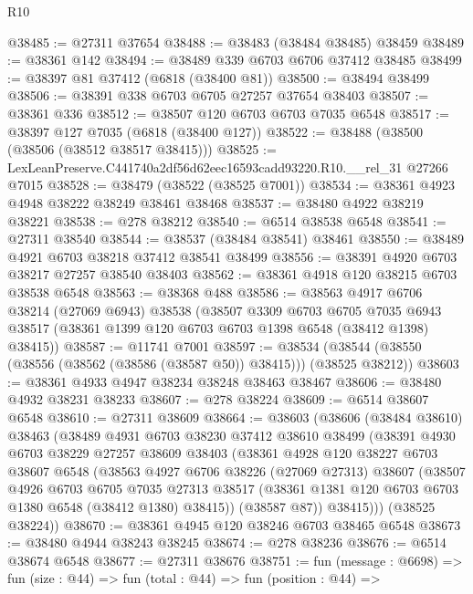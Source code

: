 \begin{lexlean}{R10}
\begin{coremodule}
@38485 := @27311 @37654
@38488 := @38483 (@38484 @38485) @38459
@38489 := @38361 @142
@38494 := @38489 @339 @6703 @6706 @37412 @38485
@38499 := @38397 @81 @37412 (@6818 (@38400 @81))
@38500 := @38494 @38499
@38506 := @38391 @338 @6703 @6705 @27257 @37654 @38403
@38507 := @38361 @336
@38512 := @38507 @120 @6703 @6703 @7035 @6548
@38517 := @38397 @127 @7035 (@6818 (@38400 @127))
@38522 := @38488 (@38500 (@38506 (@38512 @38517 @38415)))
@38525 := LexLeanPreserve.C441740a2df56d62eec16593cadd93220.R10.__rel_31 @27266 @7015
@38528 := @38479 (@38522 (@38525 @7001))
@38534 := @38361 @4923 @4948 @38222 @38249 @38461 @38468
@38537 := @38480 @4922 @38219 @38221
@38538 := @278 @38212
@38540 := @6514 @38538 @6548
@38541 := @27311 @38540
@38544 := @38537 (@38484 @38541) @38461
@38550 := @38489 @4921 @6703 @38218 @37412 @38541 @38499
@38556 := @38391 @4920 @6703 @38217 @27257 @38540 @38403
@38562 := @38361 @4918 @120 @38215 @6703 @38538 @6548
@38563 := @38368 @488
@38586 := @38563
    @4917
    @6706
    @38214
    (@27069 @6943)
    @38538
    (@38507
      @3309
      @6703
      @6705
      @7035
      @6943
      @38517
      (@38361 @1399 @120 @6703 @6703 @1398 @6548 (@38412 @1398) @38415))
@38587 := @11741 @7001
@38597 := @38534 (@38544 (@38550 (@38556 (@38562 (@38586 (@38587 @50)) @38415))) (@38525 @38212))
@38603 := @38361 @4933 @4947 @38234 @38248 @38463 @38467
@38606 := @38480 @4932 @38231 @38233
@38607 := @278 @38224
@38609 := @6514 @38607 @6548
@38610 := @27311 @38609
@38664 := @38603
    (@38606
      (@38484 @38610)
      @38463
      (@38489
        @4931
        @6703
        @38230
        @37412
        @38610
        @38499
        (@38391
          @4930
          @6703
          @38229
          @27257
          @38609
          @38403
          (@38361
            @4928
            @120
            @38227
            @6703
            @38607
            @6548
            (@38563
              @4927
              @6706
              @38226
              (@27069 @27313)
              @38607
              (@38507
                @4926
                @6703
                @6705
                @7035
                @27313
                @38517
                (@38361 @1381 @120 @6703 @6703 @1380 @6548 (@38412 @1380) @38415))
              (@38587 @87))
            @38415)))
      (@38525 @38224))
@38670 := @38361 @4945 @120 @38246 @6703 @38465 @6548
@38673 := @38480 @4944 @38243 @38245
@38674 := @278 @38236
@38676 := @6514 @38674 @6548
@38677 := @27311 @38676
@38751 := fun (message : @6698) =>
  fun (size : @44) =>
  fun (total : @44) =>
  fun (position : @44) =>

\end{coremodule}
\end{lexlean}
